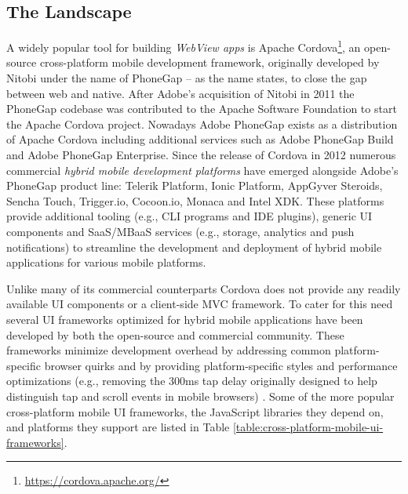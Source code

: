 \documentclass[thesis.tex]{subfiles}
\begin{document}
\subsection{The Landscape}

A widely popular tool for building \textit{WebView apps} is Apache Cordova\footnote{\url{https://cordova.apache.org/}}, an open-source cross-platform mobile development framework, originally developed by Nitobi under the name of PhoneGap -- as the name states, to close the gap between web and native. After Adobe's acquisition of Nitobi in 2011 the PhoneGap codebase was contributed to the Apache Software Foundation to start the Apache Cordova project. Nowadays Adobe PhoneGap exists as a distribution of Apache Cordova including additional services such as Adobe PhoneGap Build and Adobe PhoneGap Enterprise. Since the release of Cordova in 2012 numerous commercial \textit{hybrid mobile development platforms} have emerged alongside Adobe's PhoneGap product line:  Telerik Platform, Ionic Platform, AppGyver Steroids, Sencha Touch, Trigger.io, Cocoon.io, Monaca and Intel XDK. These platforms provide additional tooling (e.g., CLI programs and IDE plugins), generic UI components and SaaS/MBaaS services (e.g., storage, analytics and push notifications) to streamline the development and deployment of hybrid mobile applications for various mobile platforms.

Unlike many of its commercial counterparts Cordova does not provide any readily available UI components or a client-side MVC framework. To cater for this need several UI frameworks optimized for hybrid mobile applications have been developed by both the open-source and commercial community. These frameworks minimize development overhead by addressing common platform-specific browser quirks and by providing platform-specific styles and performance optimizations (e.g., removing the 300ms tap delay originally designed to help distinguish tap and scroll events in mobile browsers) \cite{click_delay}. Some of the more popular cross-platform mobile UI frameworks, the JavaScript libraries they depend on, and platforms they support are listed in Table \ref{table:cross-platform-mobile-ui-frameworks}.
\end{document}
